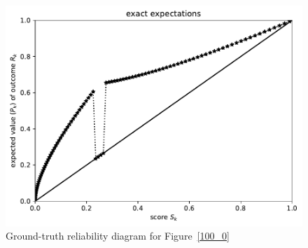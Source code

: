 \documentclass{article}
\begin{document}
\begin{figure}
\begin{centering}

\parbox{\imsize}{\includegraphics[width=\imsize]
                {./codes/unweighted/100_4_1_2/exact.pdf}}

\end{centering}
\caption{Ground-truth reliability diagram for Figure~\ref{100_0}}
\label{100_0e}
\end{figure}
\end{document}
